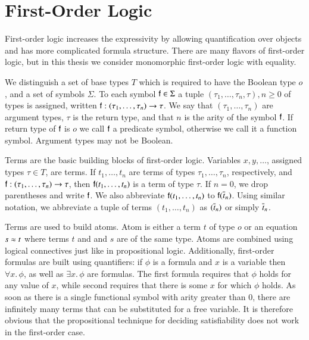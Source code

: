 \section{First-Order Logic}

First-order logic increases the expressivity by allowing quantification over
objects and has more complicated formula structure. There are many flavors of
first-order logic, but in this thesis we consider monomorphic first-order logic
with equality.

We distinguish a set of base types $T$ which is required to have the Boolean
type $o$, and a set of symbols $\Sigma$. To each symbol $\mathsf{f} \in \Sigma$ a
tuple $(\tau_1, \ldots, \tau_{n}, \tau), n \geq 0$ of types is assigned, written
$\mathsf{f} : (\tau_1, \ldots, \tau_{n}) \rightarrow \tau$. We say that $(\tau_1,
\ldots, \tau_{n})$ are argument types, $\tau$ is the return type, and that $n$
is the arity of the symbol $\mathsf{f}$. If return type of $\mathsf{f}$ is $o$ we call
$\mathsf{f}$ a predicate symbol, otherwise we call it a function symbol. Argument types may not be Boolean.

Terms are the basic building blocks of first-order logic. Variables
$x,y,\ldots$, assigned types $\tau \in T$, are terms. If $t_1,\ldots,t_n$ are
terms of types $\tau_1, \ldots, \tau_n$, respectively, and $\mathsf{f} : (\tau_1,
\ldots, \tau_{n}) \rightarrow \tau$, then $\mathsf{f}(t_1, \ldots, t_n)$ is a term
of type $\tau$. If $n=0$, we drop parentheses and write $\mathsf{f}$. We also
abbreviate $\mathsf{f}(t_1, \ldots, t_n)$ to $\mathsf{f}(\overline{t}_{n})$. Using similar notation,
we abbreviate a tuple of terms $(t_1, \ldots, t_n)$ as $(\overline{t}_{n})$ or simply $\overline{t}_{n}$.

Terms are used to build atoms. Atom is either a term $t$ of type $o$ or an
equation $s \approx t$ where terms $t$ and and $s$ are of the same type. Atoms are
combined using logical connectives just like in propositional logic.
Additionally, first-order formulas are built using quantifiers: if $\phi$ is a
formula and $x$ is a variable then $\forall x.\, \phi$, as well as $\exists x.\,
\phi$ are formulas. The first formula requires that $\phi$ holds for any value
of $x$, while second requires that there is some $x$ for which $\phi$ holds. As
soon as there is a single functional symbol with arity greater than 0, there are
infinitely many terms that can be substituted for a free variable. It is
therefore obvious that the propositional technique for deciding satisfiability
does not work in the first-order case.

